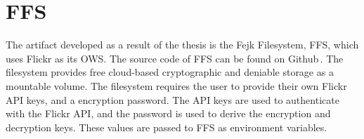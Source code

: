 \section{FFS}
\label{sec:res_ffs}
The artifact developed as a result of the thesis is the Fejk Filesystem, FFS, which uses Flickr as its OWS. The source code of FFS can be found on Github\,\cite{olssonFejkFileSystem2022}. The filesystem provides free cloud-based cryptographic and deniable storage as a mountable volume. The filesystem requires the user to provide their own Flickr API keys, and a encryption password. The API keys are used to authenticate with the Flickr API, and the password is used to derive the encryption and decryption keys. These values are passed to FFS as environment variables.